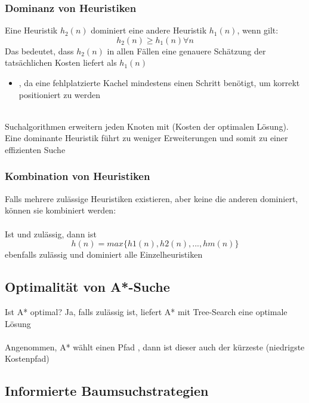 \subsubsection*{Dominanz von Heuristiken}
Eine Heuristik $h_{2}(n)$ dominiert eine andere Heuristik $h_{1}(n)$, wenn gilt:
\[
    h_{2}(n) \geq h_{1}(n) \forall n
\]
Das bedeutet, dass $h_{2}(n)$ in allen Fällen eine genauere Schätzung der tatsächlichen Kosten liefert als $h_{1}(n)$\\
\begin{itemize}
    \item {}, da eine fehlplatzierte Kachel mindestens einen Schritt benötigt, um korrekt positioniert zu werden
\end{itemize}
\\
Suchalgorithmen erweitern jeden Knoten mit  (Kosten der optimalen Lösung). Eine dominante Heuristik führt zu weniger Erweiterungen und somit zu einer effizienten Suche
\subsubsection*{Kombination von Heuristiken}
Falls mehrere zulässige Heuristiken existieren, aber keine die anderen dominiert, können sie kombiniert werden:\\
\\
Ist  und  zulässig, dann ist
\[
    h(n) = max\{h1(n), h2(n), ..., hm(n)\}
\]
ebenfalls zulässig und dominiert alle Einzelheuristiken
\subsection{Optimalität von A*-Suche}
Ist A* optimal?
Ja, falls  zulässig ist, liefert A* mit Tree-Search eine optimale Lösung\\
\\
Angenommen, A* wählt einen Pfad , dann ist dieser auch der kürzeste (niedrigste Kostenpfad)
\subsection{Informierte Baumsuchstrategien}
